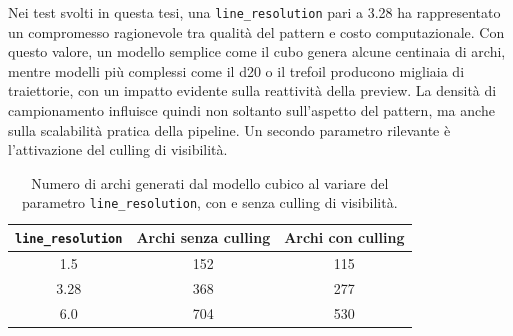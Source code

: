 \documentclass[a4paper,11pt,titlepage,twoside]{book}
\newcommand{\1}{\mathbf{1}}
\numberwithin{equation}{chapter}
\theoremstyle{plain}
\theoremstyle{definition}
\begin{document}
	Nei test svolti in questa tesi, una \texttt{line\_resolution} pari a 3.28 ha rappresentato un compromesso ragionevole tra qualità del pattern e costo computazionale. Con questo valore, un modello semplice come il cubo genera alcune centinaia di archi, mentre modelli più complessi come il d20 o il trefoil producono migliaia di traiettorie, con un impatto evidente sulla reattività della preview. La densità di campionamento influisce quindi non soltanto sull’aspetto del pattern, ma anche sulla scalabilità pratica della pipeline.
	Un secondo parametro rilevante è l’attivazione del culling di visibilità.
	
	\begin{table}[htbp]
		\centering
		\caption[Numero di archi in funzione della line resolution]{Numero di archi generati dal modello cubico al variare del parametro \texttt{line\_resolution}, con e senza culling di visibilità.}
		\label{tab:line-resolution-cube}
		\begin{tabular}{ccc}
			\toprule
			\texttt{line\_resolution} & Archi senza culling & Archi con culling \\
			\midrule
			1.5  & 152 & 115 \\
			3.28 & 368 & 277 \\
			6.0  & 704 & 530 \\
			\bottomrule
		\end{tabular}
	\end{table}
	
\end{document}
